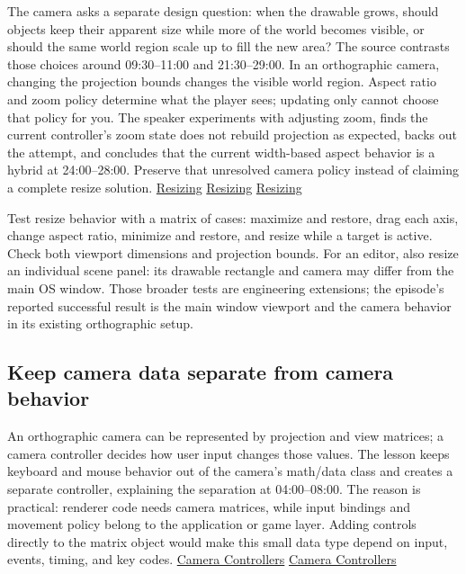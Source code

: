 The camera asks a separate design question: when the drawable grows, should objects keep their apparent size while more of the world becomes visible, or should the same world region scale up to fill the new area? The source contrasts those choices around 09:30--11:00 and 21:30--29:00. In an orthographic camera, changing the projection bounds changes the visible world region. Aspect ratio and zoom policy determine what the player sees; updating only  cannot choose that policy for you. The speaker experiments with adjusting zoom, finds the current controller's zoom state does not rebuild projection as expected, backs out the attempt, and concludes that the current width-based aspect behavior is a hybrid at 24:00--28:00. Preserve that unresolved camera policy instead of claiming a complete resize solution. \href{https://www.youtube.com/watch?v=7LswjvgRqbw&t=570s}{Resizing} \href{https://www.youtube.com/watch?v=7LswjvgRqbw&t=1290s}{Resizing} \href{https://www.youtube.com/watch?v=7LswjvgRqbw&t=1440s}{Resizing}

Test resize behavior with a matrix of cases: maximize and restore, drag each axis, change aspect ratio, minimize and restore, and resize while a target is active. Check both viewport dimensions and projection bounds. For an editor, also resize an individual scene panel: its drawable rectangle and camera may differ from the main OS window. Those broader tests are engineering extensions; the episode's reported successful result is the main window viewport and the camera behavior in its existing orthographic setup.

\subsection{Keep camera data separate from camera behavior}\label{06-engine-ii-ch026-keep-camera-data-separate-from-camera-behavior}

\hypertarget{06-engine-ii-ch026-keep-camera-data-separate-from-camera-behavior}{}

An orthographic camera can be represented by projection and view matrices; a camera controller decides how user input changes those values. The lesson keeps keyboard and mouse behavior out of the camera's math/data class and creates a separate controller, explaining the separation at 04:00--08:00. The reason is practical: renderer code needs camera matrices, while input bindings and movement policy belong to the application or game layer. Adding controls directly to the matrix object would make this small data type depend on input, events, timing, and key codes. \href{https://www.youtube.com/watch?v=q7rwMoZQSmw&t=240s}{Camera Controllers} \href{https://www.youtube.com/watch?v=q7rwMoZQSmw&t=420s}{Camera Controllers}

